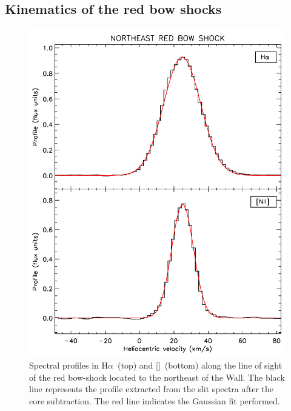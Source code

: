 \documentclass[a4paper,fleqn,usenatbib]{mnras}     %
\newcommand{\Ha} {H$\alpha$}      		%
\newcommand{\NII} {[\ion{N}{ii}]}            %
\begin{document}
\subsection{Kinematics of the red bow shocks}\label{sec:shocks_kin}

\begin{figure}
    \includegraphics[width=\columnwidth]{Figs/redbowshockNE.pdf}  
    \caption{Spectral profiles in \Ha~(top) and \NII~(bottom) along the line of sight of the red bow-shock located to the northeast of the Wall. The black line 
    represents the profile extracted from the slit spectra after the core subtraction. The red line indicates the Gaussian fit performed.}
    \label{fig:red_fits}
\end{figure}
\end{document}
